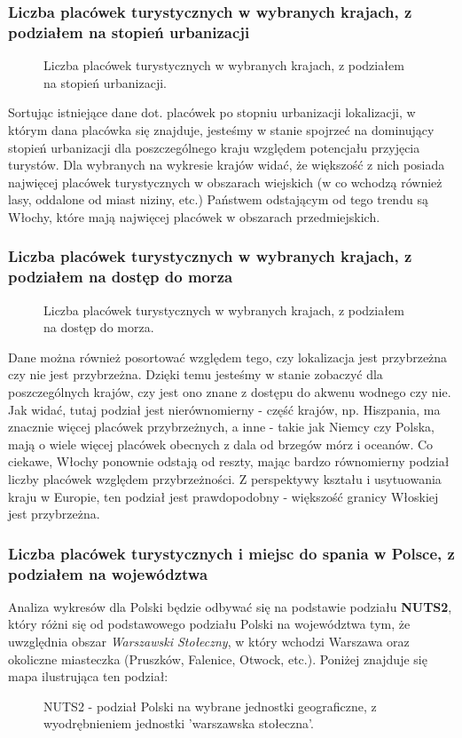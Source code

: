 \documentclass[12pt]{article}
\begin{document}
\subsubsection{Liczba placówek turystycznych w wybranych krajach, z podziałem na stopień urbanizacji}
\begin{figure}[H]
    
    \caption{Liczba placówek turystycznych w wybranych krajach, z podziałem na stopień urbanizacji.}
\end{figure}

Sortując istniejące dane dot. placówek po stopniu urbanizacji lokalizacji, w którym dana placówka się znajduje, jesteśmy w stanie spojrzeć na 
dominujący stopień urbanizacji dla poszczególnego kraju względem potencjału przyjęcia turystów. Dla wybranych na wykresie krajów widać, 
że większość z nich posiada najwięcej placówek turystycznych w obszarach wiejskich (w co wchodzą również lasy, oddalone od miast niziny, etc.)
Państwem odstającym od tego trendu są Włochy, które mają najwięcej placówek w obszarach przedmiejskich.  

\subsubsection{Liczba placówek turystycznych w wybranych krajach, z podziałem na dostęp do morza}
\begin{figure}[H]
    
    \caption{Liczba placówek turystycznych w wybranych krajach, z podziałem na dostęp do morza.}
\end{figure}

Dane można również posortować względem tego, czy lokalizacja jest przybrzeżna czy nie jest przybrzeżna. Dzięki temu jesteśmy w stanie zobaczyć
dla poszczególnych krajów, czy jest ono znane z dostępu do akwenu wodnego czy nie. 
Jak widać, tutaj podział jest nierównomierny - część krajów, np. Hiszpania, ma znacznie więcej placówek przybrzeżnych, a inne - takie jak Niemcy czy 
Polska, mają o wiele więcej placówek obecnych z dala od brzegów mórz i oceanów. Co ciekawe, Włochy ponownie odstają od reszty, mając bardzo równomierny 
podział liczby placówek względem przybrzeżności. Z perspektywy kształu i usytuowania kraju w Europie, ten podział jest prawdopodobny - większość granicy 
Włoskiej jest przybrzeżna.


\subsubsection{Liczba placówek turystycznych i miejsc do spania w Polsce, z podziałem na województwa}
Analiza wykresów dla Polski będzie odbywać się na podstawie podziału \textbf{NUTS2}, który różni się od podstawowego podziału Polski na województwa tym,
że uwzględnia obszar \textit{Warszawski Stołeczny}, w który wchodzi Warszawa oraz okoliczne miasteczka (Pruszków, Falenice, Otwock, etc.). 
Poniżej znajduje się mapa ilustrująca ten podział: 
\begin{figure}[H]
    
    \caption{NUTS2 - podział Polski na wybrane jednostki geograficzne, z wyodrębnieniem jednostki 'warszawska stołeczna'.}
\end{figure}
\end{document}

